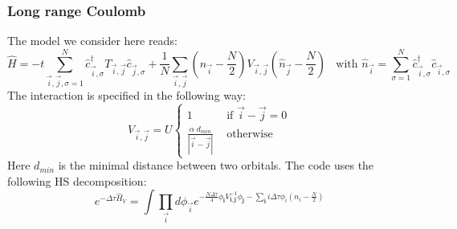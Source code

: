 
\subsubsection{Long range Coulomb}

The model we consider here reads: 
\begin{equation}
	\hat{H}  = -t \sum_{\vec{i},\vec{j},\sigma=1}^{N}   \hat{c}^{\dagger}_{\vec{i},\sigma}  T_{\vec{i},\vec{j}} \hat{c}^{}_{\vec{j},\sigma}   +     
	\frac{1} { N } \sum_{\vec{i},\vec{j}}  \left(  \hat{n}_{\vec{i}} -  \frac{N}{2}  \right)  V_{\vec{i},\vec{j}} \left(  \hat{n}_{\vec{j}} -  \frac{N}{2}  \right) \; \; 
	\text{ with }  \hat{n}_{\vec{i}} = \sum_{\sigma=1}^{N}  \hat{c}^{\dagger}_{\vec{i},\sigma}  \hat{c}^{}_{\vec{i},\sigma}
\end{equation}
The interaction is specified in the following way: 
\begin{equation}
	V_{\vec{i}, \vec{j}}   =   U \left\{
	\begin{array}{ll}  
	1          &   \text{ if } \vec{i} - \vec{j}    = 0 \\
	\frac{\alpha   \;   d_{min}}{ |   \vec{i} - \vec{j} | } &     \text{ otherwise }
	\end{array}
\right.
\end{equation}
Here $d_{min}$ is the minimal distance between two orbitals.     The code uses the following  HS decomposition:
\begin{equation}
e^{-\Delta \tau \hat{H}_V }  =  \int \prod_{\vec{i}} d \phi_{\vec{i}}   e^{ - \frac{N \Delta \tau} {4} \phi_{\pmb{i}} V^{-1}_{\pmb{i},\pmb{j}}  \phi_{\pmb{j}} - \sum_{\pmb{i}}  i \Delta \tau \phi_i \left( n_{i} - \frac{N}{2} \right) } 
\end{equation}

